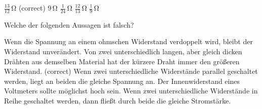 \documentclass[11pt]{exam}
\begin{document}
\begin{questions}
\begin{choices}
	\choice \(\mathrm{\frac{13}{12}\,\Omega}\) (correct)
	\choice \(\mathrm{9\,\Omega}\)
	\choice \(\mathrm{\frac{1}{24}\,\Omega}\)
	\choice \(\mathrm{\frac{12}{13}\,\Omega}\)
	\choice \(\mathrm{\frac{1}{9}\,\Omega}\)
\end{choices}

\vspace{3mm}\question Welche der folgenden Aussagen ist falsch?

\begin{choices}
	\choice Wenn die Spannung an einem ohmschen Widerstand verdoppelt wird, bleibt der Widerstand unverändert.
	\choice Von zwei unterschiedlich langen, aber gleich dicken Drähten aus demselben Material hat der kürzere Draht immer den größeren Widerstand. (correct)
	\choice Wenn zwei unterschiedliche Widerstände parallel geschaltet werden, liegt an beiden die gleiche Spannung an.
	\choice Der Innenwiderstand eines Voltmeters sollte möglichst hoch sein.
	\choice Wenn zwei unterschiedliche Widerstände in Reihe geschaltet werden, dann fließt durch beide die gleiche Stromstärke.
\end{choices}

\vspace{3mm}\end{questions}
\end{document}
